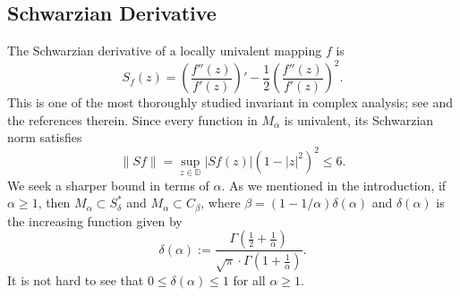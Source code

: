 \documentclass[reqno]{amsart}
\theoremstyle{plain}
\theoremstyle{definition}
\begin{document}
\subsection{Schwarzian Derivative} The Schwarzian derivative of a locally univalent mapping \( f \) is
\[S_f(z) = \left( \frac{f''(z)}{f'(z)} \right)' - \frac{1}{2} \left( \frac{f''(z)}{f'(z)} \right)^2.\]
This is one of the most thoroughly studied invariant in complex analysis; see \cite{CDO2011} and the references therein. Since every function in $M_\alpha$ is univalent, its Schwarzian norm satisfies
\[\|Sf\| = \sup_{z \in \mathbb{D}} |Sf(z)|(1-|z|^2)^2 \leq 6.\]
We seek a sharper bound in terms of $\alpha$. As we mentioned in the introduction, if $\alpha \geq 1$, then $M_\alpha \subset S^\ast_\delta$ and $M_\alpha\subset C_\beta$, where $\beta=(1-1/\alpha)\delta(\alpha)$ and $\delta(\alpha)$ is the increasing function given by
\begin{equation}\label{delta}\delta(\alpha):=\frac{\Gamma\left(\frac12+\frac1\alpha\right)}{\sqrt{\pi}\cdot \Gamma(1+\frac1\alpha)}.\end{equation}
It is not hard to see that $0\leq \delta(\alpha)\leq 1$ for all $\alpha\geq1$.
\end{document}
